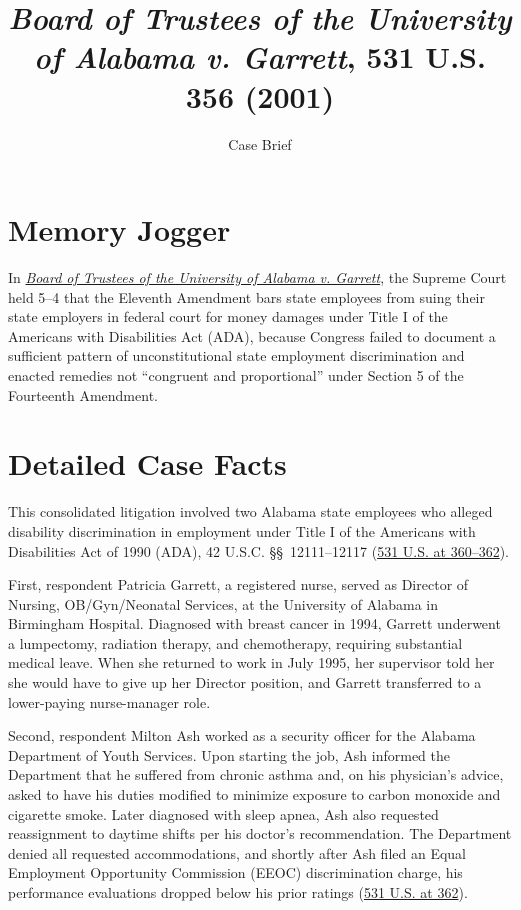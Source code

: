 \documentclass[12pt]{article}
\title{\textit{Board of Trustees of the University of Alabama v. Garrett}, 531 U.S. 356 (2001)}
\subtitle{Case Brief}
\author{}
\date{}
\begin{document}
\maketitle

\section{Memory Jogger}

In \href{https://www.courtlistener.com/opinion/118407/board-of-trustees-of-univ-of-ala-v-garrett/}{\textit{Board of Trustees of the University of Alabama v. Garrett}}, the Supreme Court held 5--4 that the Eleventh Amendment bars state employees from suing their state employers in federal court for money damages under Title I of the Americans with Disabilities Act (ADA), because Congress failed to document a sufficient pattern of unconstitutional state employment discrimination and enacted remedies not ``congruent and proportional'' under Section 5 of the Fourteenth Amendment.

\section{Detailed Case Facts}

This consolidated litigation involved two Alabama state employees who alleged disability discrimination in employment under Title I of the Americans with Disabilities Act of 1990 (ADA), 42 U.S.C. \S\S~12111--12117 (\href{https://supreme.justia.com/cases/federal/us/531/356/}{531 U.S. at 360--362}).

First, respondent Patricia Garrett, a registered nurse, served as Director of Nursing, OB/Gyn/Neonatal Services, at the University of Alabama in Birmingham Hospital. Diagnosed with breast cancer in 1994, Garrett underwent a lumpectomy, radiation therapy, and chemotherapy, requiring substantial medical leave. When she returned to work in July 1995, her supervisor told her she would have to give up her Director position, and Garrett transferred to a lower-paying nurse-manager role.

Second, respondent Milton Ash worked as a security officer for the Alabama Department of Youth Services. Upon starting the job, Ash informed the Department that he suffered from chronic asthma and, on his physician's advice, asked to have his duties modified to minimize exposure to carbon monoxide and cigarette smoke. Later diagnosed with sleep apnea, Ash also requested reassignment to daytime shifts per his doctor's recommendation. The Department denied all requested accommodations, and shortly after Ash filed an Equal Employment Opportunity Commission (EEOC) discrimination charge, his performance evaluations dropped below his prior ratings (\href{https://tile.loc.gov/storage-services/service/ll/usrep/usrep531/usrep531356/usrep531356.pdf}{531 U.S. at 362}).
\end{document}
